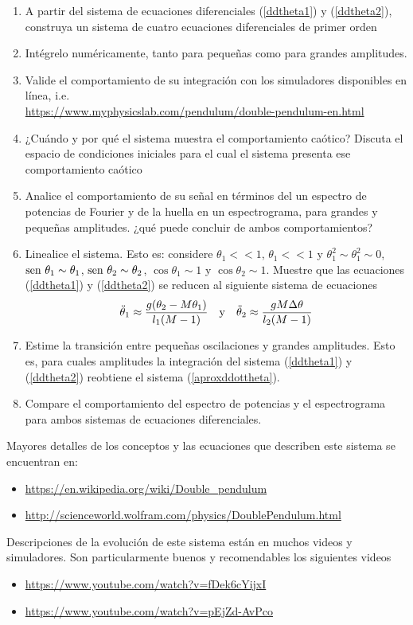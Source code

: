 \documentclass[spanish,notitlepage,letterpaper,11pt]{article} %
\begin{document}
\begin{enumerate}
    \item A partir del sistema de ecuaciones diferenciales (\ref{ddtheta1}) y (\ref{ddtheta2}), construya un sistema de cuatro ecuaciones diferenciales de primer orden 
    \item Intégrelo numéricamente, tanto para pequeñas como para grandes amplitudes. 
    \item Valide el comportamiento de su integración con los simuladores disponibles en línea, i.e. \\ \url{https://www.myphysicslab.com/pendulum/double-pendulum-en.html}
    \item ¿Cuándo y por qué el sistema muestra el comportamiento caótico? Discuta el espacio de condiciones iniciales para el cual el sistema presenta ese comportamiento caótico
    \item Analice el comportamiento de su señal en términos del un espectro de potencias de Fourier y de la huella en un espectrograma, para grandes y pequeñas amplitudes. ¿qué puede concluir de ambos comportamientos?
    \item Linealice el sistema. Esto es: considere $\theta_1 << 1$,  $\theta_1 << 1$ y $\theta_1^2 \sim \theta_1^2 \sim 0$, ${\rm sen}~\theta_1 \sim \theta_1$, ${\rm sen}~\theta_2 \sim \theta_2$, $\cos\theta_1 \sim 1 $ y $\cos\theta_2 \sim 1 $. Muestre que las ecuaciones (\ref{ddtheta1}) y (\ref{ddtheta2}) se reducen al siguiente sistema de ecuaciones
    \begin{equation}
\ddot{\theta}_1 \approx \frac{g(\theta_2 -M\theta_1)}{l_1(M -1)} \quad {\rm y} \quad \ddot{\theta}_2 \approx \frac{gM\Delta \theta}{l_2(M -1)}
\label{aproxddottheta}
    \end{equation}
    \item Estime la transición entre pequeñas oscilaciones y grandes amplitudes. Esto es, para cuales amplitudes la integración del sistema (\ref{ddtheta1}) y (\ref{ddtheta2}) reobtiene el sistema (\ref{aproxddottheta}).
    \item Compare el comportamiento del espectro de potencias y el espectrograma para ambos sistemas de ecuaciones diferenciales.
\end{enumerate}

Mayores detalles de los conceptos y las ecuaciones que describen este sistema se encuentran en: 
\begin{itemize}
    \item \url{https://en.wikipedia.org/wiki/Double_pendulum}
    \item \url{http://scienceworld.wolfram.com/physics/DoublePendulum.html}
\end{itemize}

Descripciones de la evolución de este sistema están en muchos videos y simuladores. Son particularmente buenos y recomendables los siguientes videos
\begin{itemize}
    \item \url{https://www.youtube.com/watch?v=fDek6cYijxI}
    \item \url{https://www.youtube.com/watch?v=pEjZd-AvPco}
\end{itemize}

%
%
\end{document}
